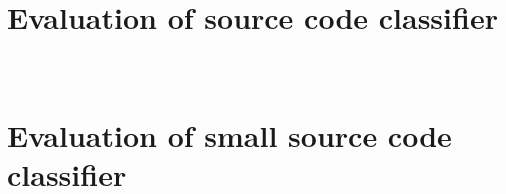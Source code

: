 \documentclass[%
a4paper,
DIV12,
2.5headlines,
bigheadings,
titlepage,
openbib,
]{scrartcl}
\begin{document}
\FloatBarrier

\FloatBarrier

\newpage
\section{\\Evaluation of source code classifier} \label{App:AppendixD}

\FloatBarrier

\FloatBarrier

\newpage
\section{\\Evaluation of small source code classifier} \label{App:AppendixE}

\FloatBarrier

\FloatBarrier
\end{document}
